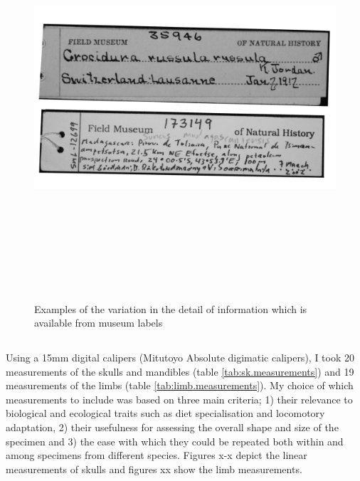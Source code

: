 \begin{figure}[h] 
  \centering
  \includegraphics[width = 15cm, height = 15cm, keepaspectratio=true]{Methods/figures/labels.png}
    \caption[Examples of museum labels]
    {Examples of the variation in the detail of information which is available from museum labels}%
  \label{fig:museum.labels}
\end{figure}
  
\subsection{} 
\label{sect:measurements} %

	Using a 15mm digital calipers (Mitutoyo Absolute digimatic calipers), I took 20 measurements of the skulls and mandibles (table \ref{tab:sk.measurements}) and 19 measurements of the limbs (table \ref{tab:limb.measurements}). My choice of which measurements to include was based on three main criteria; 1) their relevance to biological and ecological traits such as diet specialisation and locomotory adaptation, 2) their usefulness for assessing the overall shape and size of the specimen and 3) the ease with which they could be repeated both within and among specimens from different species. 
	Figures x-x depict the linear measurements of skulls and figures xx show the limb measurements. %

